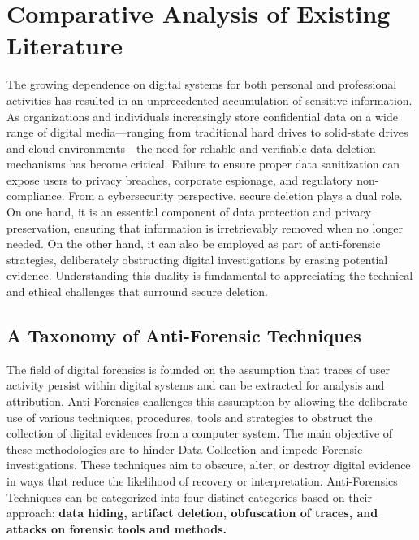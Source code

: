 \chapter {Comparative Analysis of Existing Literature } %

\label{sec:literature_review}

The growing dependence on digital systems for both personal and professional activities has 
resulted in an unprecedented accumulation of sensitive information. As organizations and 
individuals increasingly store confidential data on a wide range of digital media—ranging 
from traditional hard drives to solid-state drives and cloud environments—the need for reliable 
and verifiable data deletion mechanisms has become critical. Failure to ensure proper data 
sanitization can expose users to privacy breaches, corporate espionage, and regulatory 
non-compliance. From a cybersecurity perspective, secure deletion plays a dual role. On one hand, 
it is an essential component of data protection and privacy preservation, ensuring that 
information is irretrievably removed when no longer needed. On the other hand, it can also be 
employed as part of anti-forensic strategies, deliberately obstructing digital investigations by 
erasing potential evidence. Understanding this duality is fundamental to appreciating the 
technical and ethical challenges that surround secure deletion.

\section {A Taxonomy of Anti-Forensic Techniques} %

The field of digital forensics is founded on the assumption that traces of user activity persist 
within digital systems and can be extracted for analysis and attribution. Anti-Forensics 
challenges this assumption by allowing the deliberate use of various techniques, procedures, 
tools and strategies to obstruct the collection of digital evidences from a computer system. The 
main objective of these methodologies are to hinder Data Collection and impede Forensic 
investigations. These techniques aim to obscure, alter, or destroy digital evidence in ways that 
reduce the likelihood of recovery or interpretation. Anti-Forensics Techniques can be categorized 
into four distinct categories based on their approach: \textbf{data hiding, artifact deletion, obfuscation of traces, and attacks on forensic tools and methods.} \cite{SystematicReview} 

